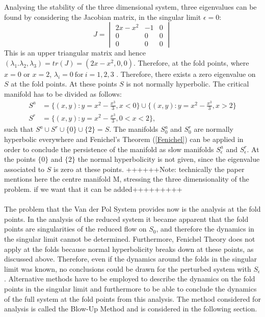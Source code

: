 Analysing the stability of the three dimensional system, three eigenvalues can be found by considering the Jacobian matrix, in the singular limit $\epsilon=0$: 
\begin{equation} 
    J=\begin{vmatrix} 2x-x^2 & -1&0 \\ 0 & 0&0\\0&0&0\end{vmatrix}
    \label{eq: Eigenvalues}
\end{equation}
This is an upper triangular matrix and hence $(\lambda_1.\lambda_2,\lambda_3)=tr(J)= (2x-x^2,0,0)$. Therefore, at the fold points, where $x=0$ or $x=2$, $\lambda_i=0 \ \text{for} \ i=1,2,3$ . Therefore, there exists a zero eigenvalue on $S$ at the fold points. At these points $S$ is not normally hyperbolic.
The critical manifold has to be divided as follows:
\begin{align*}
S^a &= \{ (x,y): y = x^2-\frac{x^3}{3}, x< 0 \} \cup  \{ (x,y): y = x^2-\frac{x^3}{3}, x>2 \} \\
S^r &= \{ (x,y): y = x^2-\frac{x^3}{3}, 0< x< 2 \},
\end{align*}
such that $S^a \cup S^r \cup \{0\} \cup \{2\} = S$.
The manifolds $S^a_0$ and $S^r_0$ are normally hyperbolic everywhere and Fenichel's Theorem (\ref{Fenichel}) can be applied in order to conclude the persistence of the manifold as slow manifolds $S^a_\epsilon$ and $S^r_\epsilon$. At the points $\{0\}$ and $\{2 \}$ the normal hyperbolicity is not given, since the eigenvalue associated to $S$ is zero at these points.
++++++Note: technically the paper mentions here the centre manifold M, stressing the three dimensionality of the problem. if we want that it can be added+++++++++
\\
\\
The problem that the Van der Pol System provides now is the analysis at the fold points.
In the analysis of the reduced system it became apparent that the fold points are singularities of the reduced flow on $S_0$, and therefore the dynamics in the singular limit cannot be determined. Furthermore, Fenichel Theory does not apply at the folds because normal hyperbolicity breaks down at these points, as discussed above. Therefore, even if the dynamics around the folds in the singular limit was known, no conclusions could be drawn for the perturbed system with $S_\epsilon$.
Alternative methods have to be employed to describe the dynamics on the fold points in the singular limit and furthermore to be able to conclude the dynamics of the full system at the fold points from this analysis.
The method considered for analysis is called the Blow-Up Method and is considered in the following section.























 